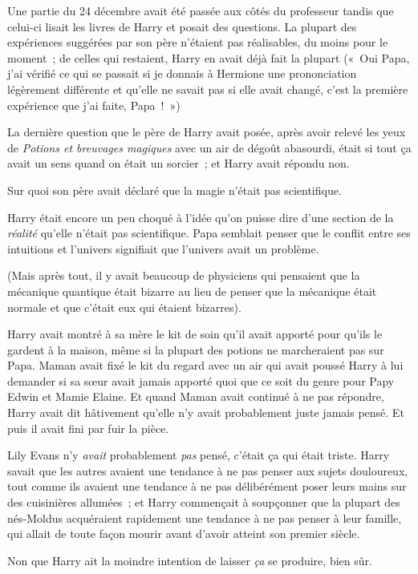 Une partie du 24 décembre avait été passée aux côtés du professeur tandis que celui-ci lisait les livres de Harry et posait des questions. La plupart des expériences suggérées par son père n'étaient pas réalisables, du moins pour le moment~; de celles qui restaient, Harry en avait déjà fait la plupart («~Oui Papa, j'ai vérifié ce qui se passait si je donnais à Hermione une prononciation légèrement différente et qu'elle ne savait pas si elle avait changé, c'est la première expérience que j'ai faite, Papa~!~»)

La dernière question que le père de Harry avait posée, après avoir relevé les yeux de \emph{Potions et breuvages magiques} avec un air de dégoût abasourdi, était si tout ça avait un sens quand on était un sorcier~; et Harry avait répondu non.

Sur quoi son père avait déclaré que la magie n'était pas scientifique.

Harry était encore un peu choqué à l'idée qu'on puisse dire d'une section de la \emph{réalité} qu'elle n'était pas scientifique. Papa semblait penser que le conflit entre ses intuitions et l'univers signifiait que l'univers avait un problème.

(Mais après tout, il y avait beaucoup de physiciens qui pensaient que la mécanique quantique était bizarre au lieu de penser que la mécanique était normale et que c'était eux qui étaient bizarres).

Harry avait montré à sa mère le kit de soin qu'il avait apporté pour qu'ils le gardent à la maison, même si la plupart des potions ne marcheraient pas sur Papa. Maman avait fixé le kit du regard avec un air qui avait poussé Harry à lui demander si sa sœur avait jamais apporté quoi que ce soit du genre pour Papy Edwin et Mamie Elaine. Et quand Maman avait continué à ne pas répondre, Harry avait dit hâtivement qu'elle n'y avait probablement juste jamais pensé. Et puis il avait fini par fuir la pièce.

Lily Evans n'y \emph{avait} probablement \emph{pas} pensé, c'était ça qui était triste. Harry savait que les autres avaient une tendance à ne pas penser aux sujets douloureux, tout comme ils avaient une tendance à ne pas délibérément poser leurs mains sur des cuisinières allumées~; et Harry commençait à soupçonner que la plupart des nés-Moldus acquéraient rapidement une tendance à ne pas penser à leur famille, qui allait de toute façon mourir avant d'avoir atteint son premier siècle.

Non que Harry ait la moindre intention de laisser \emph{ça} se produire, bien sûr.

